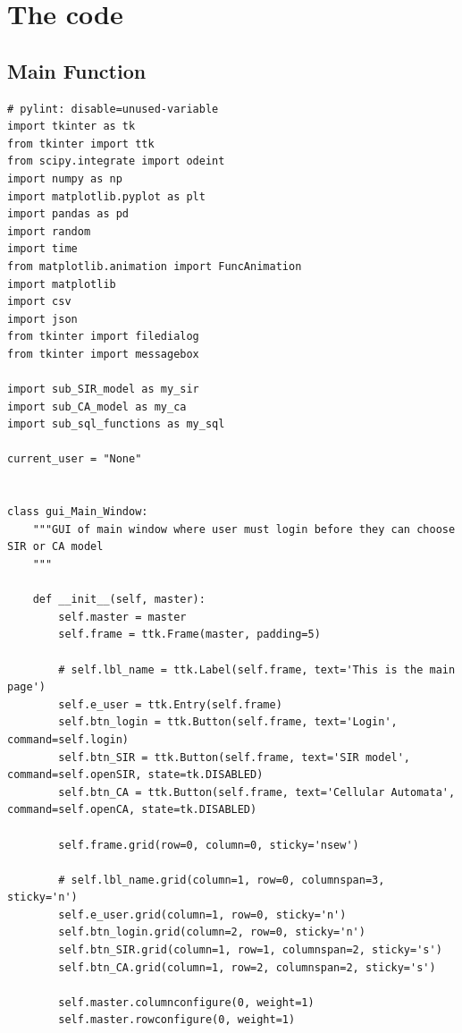 \documentclass[11pt, a4paper]{article}
\begin{document}

\newpage
\section{The code}


\subsection{Main Function}
\begin{lstlisting}
# pylint: disable=unused-variable
import tkinter as tk
from tkinter import ttk
from scipy.integrate import odeint
import numpy as np
import matplotlib.pyplot as plt
import pandas as pd
import random
import time
from matplotlib.animation import FuncAnimation
import matplotlib
import csv
import json
from tkinter import filedialog
from tkinter import messagebox

import sub_SIR_model as my_sir
import sub_CA_model as my_ca
import sub_sql_functions as my_sql

current_user = "None"


class gui_Main_Window:
    """GUI of main window where user must login before they can choose SIR or CA model
    """

    def __init__(self, master):
        self.master = master
        self.frame = ttk.Frame(master, padding=5)

        # self.lbl_name = ttk.Label(self.frame, text='This is the main page')
        self.e_user = ttk.Entry(self.frame)
        self.btn_login = ttk.Button(self.frame, text='Login', command=self.login)
        self.btn_SIR = ttk.Button(self.frame, text='SIR model', command=self.openSIR, state=tk.DISABLED)
        self.btn_CA = ttk.Button(self.frame, text='Cellular Automata', command=self.openCA, state=tk.DISABLED)

        self.frame.grid(row=0, column=0, sticky='nsew')

        # self.lbl_name.grid(column=1, row=0, columnspan=3, sticky='n')
        self.e_user.grid(column=1, row=0, sticky='n')
        self.btn_login.grid(column=2, row=0, sticky='n')
        self.btn_SIR.grid(column=1, row=1, columnspan=2, sticky='s')
        self.btn_CA.grid(column=1, row=2, columnspan=2, sticky='s')

        self.master.columnconfigure(0, weight=1)
        self.master.rowconfigure(0, weight=1)


\end{lstlisting}
\end{document}
